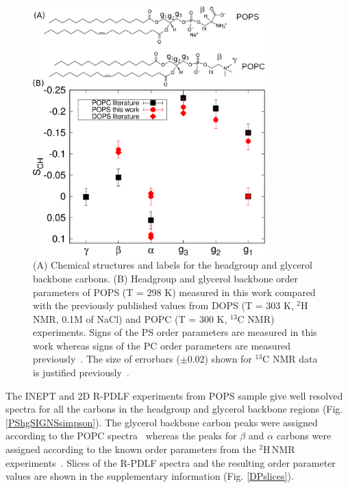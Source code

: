 \documentclass[aps,prl,superscriptaddress,twocolumn]{revtex4}
\begin{document}
\begin{figure}[!htb]
  \centering
  \includegraphics[width=9.0cm]{../Figs/PCPScomp.eps}
  \caption{\label{HGorderParameters}
    (A) Chemical structures and labels for the headgroup and glycerol backbone carbons.
    (B) Headgroup and glycerol backbone order parameters of POPS (T = 298 K) measured in this work compared
    with the previously published values from DOPS (T = 303 K, $^2$H NMR, 0.1M of NaCl) \cite{browning80} and 
    POPC  (T = 300 K, $^{13}$C NMR) \cite{ferreira13} experiments. Signs of the PS order parameters
    are measured in this work whereas signs of the PC order parameters are measured previously~\cite{ferreira16}.
    The size of errorbars ($\pm$0.02) shown for $^{13}$C NMR data is justified previously~\cite{botan15,ollila16}. 
  }
\end{figure}

The INEPT and 2D R-PDLF experiments from POPS sample give well resolved spectra for all the
carbons in the headgroup and glycerol backbone regions (Fig. \ref{PShgSIGNSsimpson}).
The glycerol backbone carbon peaks were assigned according to the POPC spectra~\cite{ferreira13} whereas
the peaks for $\beta$ and $\alpha$ carbons were assigned according to the
known order parameters from the $^2$H\,NMR experiments~\cite{browning80}.
Slices of the R-PDLF spectra and the resulting order parameter values
are shown in the supplementary information (Fig. \ref{DPslices}). 
\end{document}
